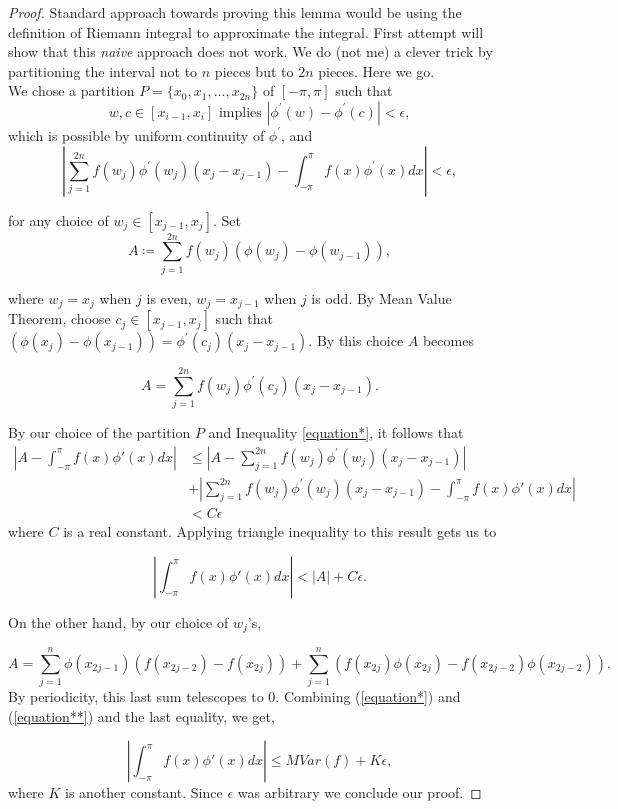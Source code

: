 \documentclass[12pt]{amsart}
\theoremstyle{definition}
\begin{document}
\begin{proof}
    Standard approach towards proving this lemma would be using the definition of Riemann integral to approximate the integral. First attempt will show that this \emph{naive} approach does not work. We do (not me) a clever trick by partitioning the interval not to $n$ pieces but to $2n$ pieces. Here we go.\\
    We chose a partition $P = \{x_0, x_1, \dots , x_{2n}\}$ of $[-\pi,\pi]$ such that
    \[
w, c \in [x_{i-1}, x_i] \text{ implies } |\phi^{\prime}(w) - \phi^{\prime}(c)| < \epsilon,
\] 
which is possible by uniform continuity of $\phi^{\prime}$, and 
\begin{equation}\label{equation*}
    \left| \sum_{j=1}^{2n} f(w_j)\phi^{\prime}(w_j)(x_j - x_{j-1}) - \int_{-\pi}^{\pi}f(x)\phi^{\prime}(x)dx\right| < \epsilon,
\end{equation}

    for any choice of $w_j \in [x_{j-1},x_j]$. Set
\[
A \coloneqq \sum_{j=1}^{2n} f(w_j)(\phi(w_j) - \phi(w_{j-1})),
\]

where $w_j = x_j$ when $j$ is even, $w_j = x_{j-1}$ when $j$ is odd. By Mean Value Theorem, choose $c_j \in [x_{j-1},x_j]$ such that $(\phi(x_j) - \phi(x_{j-1})) = \phi^{\prime}(c_j)(x_j - x_{j-1})$. By this choice $A$ becomes

\[
A = \sum_{j=1}^{2n} f(w_j)\phi^{\prime}(c_j)(x_j - x_{j-1}).
\]

    By our choice of the partition $P$ and Inequality \ref{equation*}, it follows that
\[
\begin{aligned}
    \left| A - \int_{-\pi}^{\pi}f(x)\phi'(x)dx\right| 
    &\leq \left| A - \sum_{j=1}^{2n} f(w_j)\phi^{\prime}(w_j)(x_j - x_{j-1})\right| \\
    &+ \left|\sum_{j=1}^{2n} f(w_j)\phi^{\prime}(w_j)(x_j - x_{j-1}) - \int_{-\pi}^{\pi}f(x)\phi'(x)dx\right| \\
    &< C \epsilon 
\end{aligned}
\]
where $C$ is a real constant. Applying triangle inequality to this result gets us to

\begin{equation}\label{equation**}
    \left|\int_{-\pi}^{\pi}f(x)\phi'(x)dx\right| < |A| + C\epsilon.
\end{equation}


On the other hand, by our choice of $w_j$'s,

\[
A = \sum_{j=1}^{n}\phi(x_{2j-1})(f(x_{2j-2}) - f(x_{2j})) + \sum_{j=1}^{n}(f(x_{2j})\phi(x_{2j}) - f(x_{2j-2})\phi(x_{2j-2})).
\]
By periodicity, this last sum telescopes to 0. Combining (\ref{equation*}) and (\ref{equation**}) and the last equality, we get,

\[
\left|\int_{-\pi}^{\pi}f(x)\phi'(x)dx\right| \leq M Var(f) + K\epsilon,
\]
where $K$ is another constant. Since $\epsilon$ was arbitrary we conclude our proof.
\end{proof}
\end{document}
